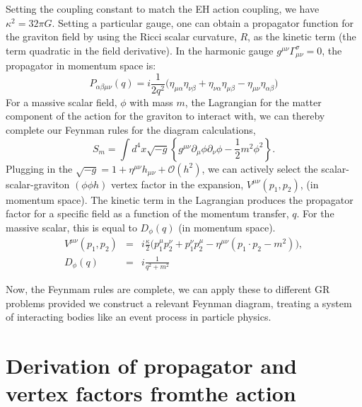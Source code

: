 \documentclass[%
 aip,
rsi,%
 amsmath,amssymb,
 reprint,%
]{revtex4-1}
\begin{document}
Setting the coupling constant to match the EH action coupling, we have $\kappa^2=32\pi G$. Setting a particular gauge, one can obtain a propagator function for the graviton field by using the Ricci scalar curvature, $R$, as the kinetic term (the term quadratic in the field derivative). In the harmonic gauge $g^{\mu\nu}\Gamma^{\sigma}_{\mu\nu}=0$, the propagator in momentum space is:
\begin{equation}
	P_{\alpha\beta\mu\nu}(q)=i\frac{1}{2q^2}\Big( \eta_{\mu\alpha}\eta_{\nu\beta}+\eta_{\nu\alpha}\eta_{\mu\beta}-\eta_{\mu\nu}\eta_{\alpha\beta}\Big)
\end{equation}
For a massive scalar field, $\phi$ with mass $m$, the Lagrangian for the matter component of the action for the graviton to interact with, we can thereby complete our Feynman rules for the diagram calculations,
\begin{equation}
S_m=\int d^4 x\sqrt{-g}\left\lbrace g^{\mu\nu}\partial_\mu\phi\partial_\nu\phi - \frac{1}{2}m^2\phi^2\right\rbrace .
\end{equation}
Plugging in the $\sqrt{-g}=1+\eta^{\mu\nu}h_{\mu\nu}+\mathcal{O}(h^2)$, we can actively select the scalar-scalar-graviton $(\phi\phi h)$ vertex factor in the expansion, $V^{\mu\nu}(p_1,p_2)$, (in momentum space).
The kinetic term in the Lagrangian produces the propagator factor for a specific field as a function of the momentum transfer, $q$. For the massive scalar, this is equal to $D_\phi(q)$ (in momentum space).
\begin{eqnarray}
	V^{\mu\nu}(p_1,p_2)&=&i\frac{\kappa}{2}\Big(p_1^\mu p_2^\nu+ p_1^\nu p_2^\mu-\eta^{\mu\nu}(p_1\cdot p_2-m^2)\Big),\\ 	D_\phi(q)&=&i\frac{1}{q^2+m^2}  
\end{eqnarray}

Now, the Feynmam rules are complete, we can apply these to different GR problems provided we construct a relevant Feynman diagram, treating a system of interacting bodies like an event process in particle physics. 

\appendix

\section{Derivation of propagator and vertex factors fromthe action}
\end{document}
